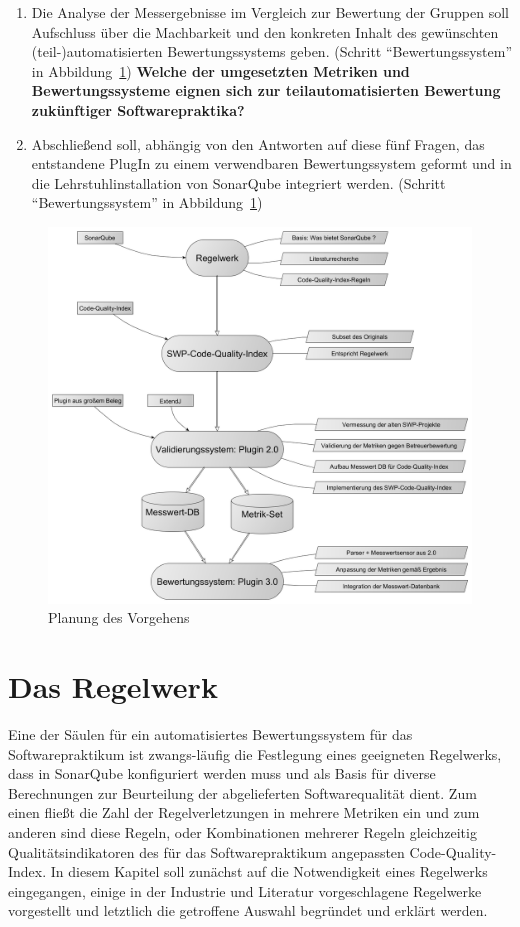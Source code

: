 \documentclass[da,ngerman]{stthesis}
\begin{document}
\begin{enumerate}
				\item Die Analyse der Messergebnisse im Vergleich zur Bewertung der Gruppen soll Aufschluss über die Machbarkeit und den konkreten Inhalt des gewünschten (teil-)automatisierten Bewertungssystems geben. (Schritt "`Bewertungssystem"' in Abbildung~\ref{planning})\newline \newline
				\textbf{Welche der umgesetzten Metriken und Bewertungssysteme eignen sich zur teilautomatisierten Bewertung zukünftiger Softwarepraktika?}
				\item Abschließend soll, abhängig von den Antworten auf diese fünf Fragen, das entstandene PlugIn zu einem verwendbaren Bewertungssystem geformt und in die Lehrstuhlinstallation von SonarQube integriert werden. (Schritt "`Bewertungssystem"' in Abbildung~\ref{planning}) 
			\end{enumerate}
  			\begin{figure} [h]
				\centering
				\includegraphics [width=\textwidth] {planning.png}
				\caption{Planung des Vorgehens}
				\label{planning}
			\end{figure}
    
	\chapter{Das Regelwerk}
		Eine der Säulen für ein automatisiertes Bewertungssystem für das Softwarepraktikum ist zwangs-läufig die Festlegung eines geeigneten Regelwerks, dass in SonarQube konfiguriert werden muss und als Basis für diverse Berechnungen zur Beurteilung der abgelieferten Softwarequalität dient. Zum einen fließt die Zahl der Regelverletzungen in mehrere Metriken ein und zum anderen sind diese Regeln, oder Kombinationen mehrerer Regeln gleichzeitig Qualitätsindikatoren des für das Softwarepraktikum angepassten Code-Quality-Index. In diesem Kapitel soll zunächst auf die Notwendigkeit eines Regelwerks eingegangen, einige in der Industrie und Literatur vorgeschlagene Regelwerke vorgestellt und letztlich die getroffene Auswahl begründet und erklärt werden.
\end{document}
